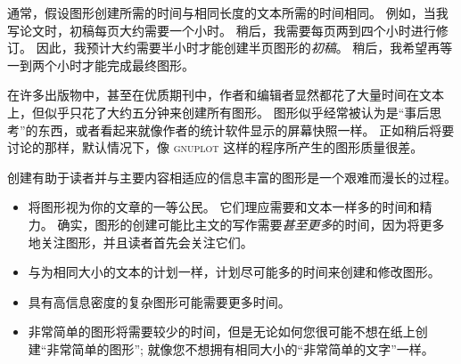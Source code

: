 通常，假设图形创建所需的时间与相同长度的文本所需的时间相同。 例如，当我写论文时，初稿每页大约需要一个小时。 稍后，我需要每页两到四个小时进行修订。 因此，我预计大约需要半小时才能创建半页图形的\emph{初稿}。 稍后，我希望再等一到两个小时才能完成最终图形。


在许多出版物中，甚至在优质期刊中，作者和编辑者显然都花了大量时间在文本上，但似乎只花了大约五分钟来创建所有图形。 图形似乎经常被认为是``事后思考''的东西，或者看起来就像作者的统计软件显示的屏幕快照一样。 正如稍后将要讨论的那样，默认情况下，像 \textsc{gnuplot} 这样的程序所产生的图形质量很差。


创建有助于读者并与主要内容相适应的信息丰富的图形是一个艰难而漫长的过程。

%
\begin{itemize}
    \item 将图形视为你的文章的一等公民。 它们理应需要和文本一样多的时间和精力。 确实，图形的创建可能比主文的写作需要\emph{甚至更多}的时间，因为将更多地关注图形，并且读者首先会关注它们。
    \item 与为相同大小的文本的计划一样，计划尽可能多的时间来创建和修改图形。
    \item 具有高信息密度的复杂图形可能需要更多时间。
    \item 非常简单的图形将需要较少的时间，但是无论如何您很可能不想在纸上创建``非常简单的图形''; 就像您不想拥有相同大小的``非常简单的文字''一样。
\end{itemize}


